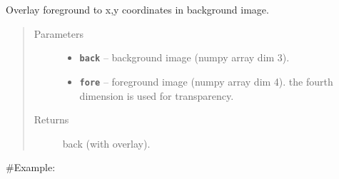 \documentclass[letterpaper,10pt,english]{sphinxmanual}
\begin{document}
\begin{fulllineitems}
\label{RRtoolbox.lib.arrayops:RRtoolbox.lib.arrayops.basic.overlay2}
Overlay foreground to x,y coordinates in background image.
\begin{quote}\begin{description}
\item[{Parameters}] \leavevmode\begin{itemize}
\item {} 
\textbf{\texttt{back}} -- background image (numpy array dim 3).

\item {} 
\textbf{\texttt{fore}} -- foreground image (numpy array dim 4). the fourth
dimension is used for transparency.

\end{itemize}

\item[{Returns}] \leavevmode
back (with overlay).

\end{description}\end{quote}

\#Example:


\end{fulllineitems}
\end{document}
